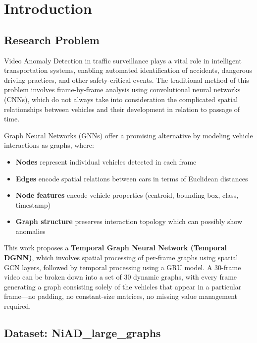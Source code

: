 
\chapter{Introduction}
\label{ch:introduction}

\section{Research Problem}

Video Anomaly Detection in traffic surveillance plays a vital role in intelligent transportation systems, enabling automated identification of accidents, dangerous driving practices, and other safety-critical events. The traditional method of this problem involves frame-by-frame analysis using convolutional neural networks (CNNs), which do not always take into consideration the complicated spatial relationships between vehicles and their development in relation to passage of time.

Graph Neural Networks (GNNs) offer a promising alternative by modeling vehicle interactions as graphs, where:
\begin{itemize}
    \item \textbf{Nodes} represent individual vehicles detected in each frame
    \item \textbf{Edges} encode spatial relations between cars in terms of Euclidean distances
    \item \textbf{Node features} encode vehicle properties (centroid, bounding box, class, timestamp)
    \item \textbf{Graph structure} preserves interaction topology which can possibly show anomalies
\end{itemize}

This work proposes a \textbf{Temporal Graph Neural Network (Temporal DGNN)}, which involves spatial processing of per-frame graphs using spatial GCN layers, followed by temporal processing using a GRU model. A 30-frame video can be broken down into a set of 30 dynamic graphs, with every frame generating a graph consisting solely of the vehicles that appear in a particular frame---no padding, no constant-size matrices, no missing value management required.

\section{Dataset: NiAD\_large\_graphs}

